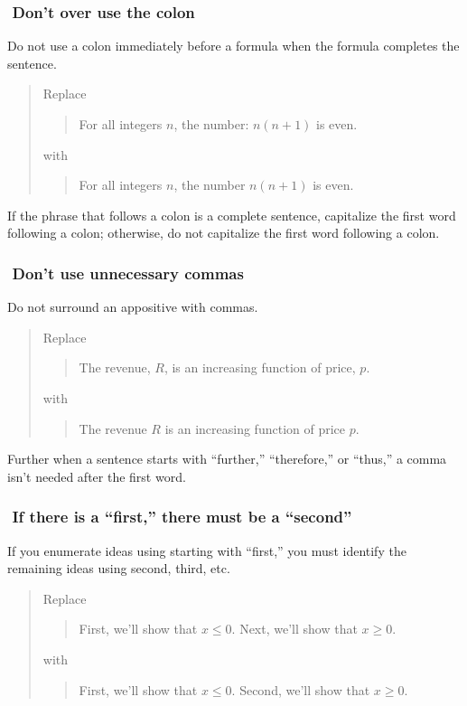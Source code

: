\documentclass[12pt,fleqn]{article}
\newcounter{ex}\setcounter{ex}{0}
\newcommand{\ex}{%
\hspace{-0.2in} \setcounter{ex}{\value{ex}+1}
\theex \,\,}
\newcounter{id}\setcounter{id}{0}
\newcounter{se}\setcounter{se}{0}
\begin{document}
\subsubsection*{\ex Don't over use the colon}

Do not use a colon immediately before a formula when the formula 
completes the sentence.

\begin{quote}
Replace
\begin{quote}
  For all integers \(n\), the number: \(n (n + 1) \) is even.
\end{quote}
with
\begin{quote}
   For all integers \(n\), the number \(n (n + 1) \) is even.
\end{quote}
\end{quote}
If the phrase that follows a colon is a complete sentence, 
capitalize the first word following a colon; otherwise, do
not capitalize the first word following a colon.
 
\subsubsection*{\ex Don't use unnecessary commas}

Do not surround an appositive with commas.

\begin{quote}
Replace
\begin{quote}
  The revenue, \(R\), is an increasing function of price, \(p\).
\end{quote}
with
\begin{quote}
  The revenue \(R\) is an increasing function of price \(p\).
\end{quote}
\end{quote}
Further when a sentence starts with ``further,'' ``therefore,'' or ``thus,''
a comma isn't needed after the first word.


\subsubsection*{\ex If there is a ``first,'' there must be a ``second''}

If you enumerate ideas using starting with ``first,'' you must identify
the remaining ideas using second, third, etc.

\begin{quote}
Replace
\begin{quote}
First, we'll show that \(x \leq 0\). Next, we'll show that
\(x \geq 0\).
\end{quote}
with
\begin{quote}
First, we'll show that \(x \leq 0\).  Second, we'll show that
\mbox{\(x \geq 0\)}.
\end{quote}
\end{quote}
\end{document}

